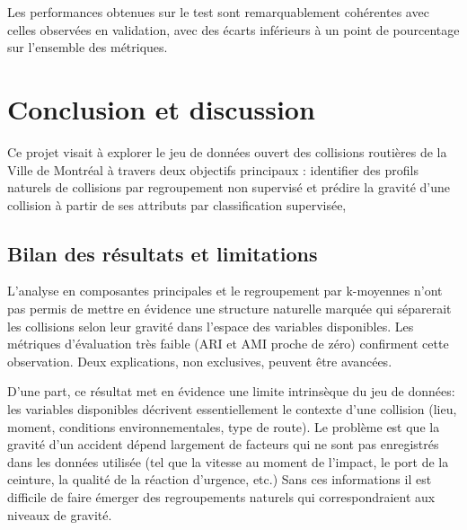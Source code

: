 \documentclass[11pt]{article}
\begin{document}
Les performances obtenues sur le test sont remarquablement cohérentes 
avec celles observées en validation, avec des écarts inférieurs à un 
point de pourcentage sur l'ensemble des métriques.

 
\section{Conclusion et discussion}
 
 
Ce projet visait à explorer le jeu de données ouvert des collisions routières de la Ville de Montréal à travers deux objectifs principaux : identifier des profils naturels de collisions par regroupement non supervisé et prédire la gravité d'une collision à partir de ses attributs par classification supervisée,

\subsection{Bilan des résultats et limitations}
L'analyse en composantes principales et le regroupement par k-moyennes n'ont pas permis de mettre en évidence une structure naturelle marquée qui séparerait les collisions selon leur gravité dans l'espace des variables disponibles. Les métriques d'évaluation très faible (ARI et AMI proche de zéro) confirment cette observation. Deux explications, non exclusives, peuvent être avancées.

D'une part, ce résultat met en évidence une limite intrinsèque du jeu de données: les variables disponibles décrivent essentiellement le contexte d'une collision (lieu, moment, conditions environnementales, type de route). Le problème est que la gravité d'un accident dépend largement de facteurs qui ne sont pas enregistrés dans les données utilisée (tel que la vitesse au moment de l'impact, le port de la ceinture, la qualité de la réaction d'urgence, etc.) Sans ces informations il est difficile de faire émerger des regroupements naturels qui correspondraient aux niveaux de gravité.
\end{document}
